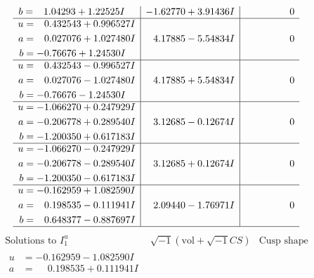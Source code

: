 \documentclass[1p]{elsarticle_modified}
\theoremstyle{definition}
\newcommand{\I}{\sqrt{-1}}
\begin{document}
$$\begin{array}{c|c|c}
\begin{aligned}
b &= \phantom{-}1.04293 + 1.22525 I\end{aligned}
 & -1.62770 + 3.91436 I & \phantom{-0.000000 } 0 \\ \hline\begin{aligned}
u &= \phantom{-}0.432543 + 0.996527 I \\
a &= \phantom{-}0.027076 + 1.027480 I \\
b &= -0.76676 + 1.24530 I\end{aligned}
 & \phantom{-}4.17885 - 5.54834 I & \phantom{-0.000000 } 0 \\ \hline\begin{aligned}
u &= \phantom{-}0.432543 - 0.996527 I \\
a &= \phantom{-}0.027076 - 1.027480 I \\
b &= -0.76676 - 1.24530 I\end{aligned}
 & \phantom{-}4.17885 + 5.54834 I & \phantom{-0.000000 } 0 \\ \hline\begin{aligned}
u &= -1.066270 + 0.247929 I \\
a &= -0.206778 + 0.289540 I \\
b &= -1.200350 + 0.617183 I\end{aligned}
 & \phantom{-}3.12685 - 0.12674 I & \phantom{-0.000000 } 0 \\ \hline\begin{aligned}
u &= -1.066270 - 0.247929 I \\
a &= -0.206778 - 0.289540 I \\
b &= -1.200350 - 0.617183 I\end{aligned}
 & \phantom{-}3.12685 + 0.12674 I & \phantom{-0.000000 } 0 \\ \hline\begin{aligned}
u &= -0.162959 + 1.082590 I \\
a &= \phantom{-}0.198535 - 0.111941 I \\
b &= \phantom{-}0.648377 - 0.887697 I\end{aligned}
 & \phantom{-}2.09440 - 1.76971 I & \phantom{-0.000000 } 0\\
 \hline 
 \end{array}$$\newpage$$\begin{array}{c|c|c}  
\text{Solutions to }I^u_{1}& \I (\text{vol} + \sqrt{-1}CS) & \text{Cusp shape}\\
 \hline 
\begin{aligned}
u &= -0.162959 - 1.082590 I \\
a &= \phantom{-}0.198535 + 0.111941 I \\

\end{aligned}
\end{array}$$
\end{document}
